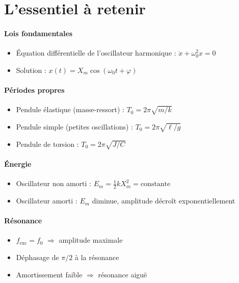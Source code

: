 \section{L'essentiel à retenir}

\begin{synthese}
\paragraph{Lois fondamentales}
\begin{itemize}
    \item Équation différentielle de l'oscillateur harmonique : $\ddot{x} + \omega_0^2 x = 0$
    \item Solution : $x(t) = X_m\cos(\omega_0 t + \varphi)$
\end{itemize}

\paragraph{Périodes propres}
\begin{itemize}
    \item Pendule élastique (masse-ressort) : $T_0 = 2\pi\sqrt{m/k}$
    \item Pendule simple (petites oscillations) : $T_0 = 2\pi\sqrt{\ell/g}$
    \item Pendule de torsion : $T_0 = 2\pi\sqrt{J/C}$
\end{itemize}

\paragraph{Énergie}
\begin{itemize}
    \item Oscillateur non amorti : $E_m = \frac{1}{2}k X_m^2 = \text{constante}$
    \item Oscillateur amorti : $E_m$ diminue, amplitude décroît exponentiellement
\end{itemize}

\paragraph{Résonance}
\begin{itemize}
    \item $f_{\text{exc}} = f_0$ $\Rightarrow$ amplitude maximale
    \item Déphasage de $\pi/2$ à la résonance
    \item Amortissement faible $\Rightarrow$ résonance aiguë
\end{itemize}


\end{synthese}
